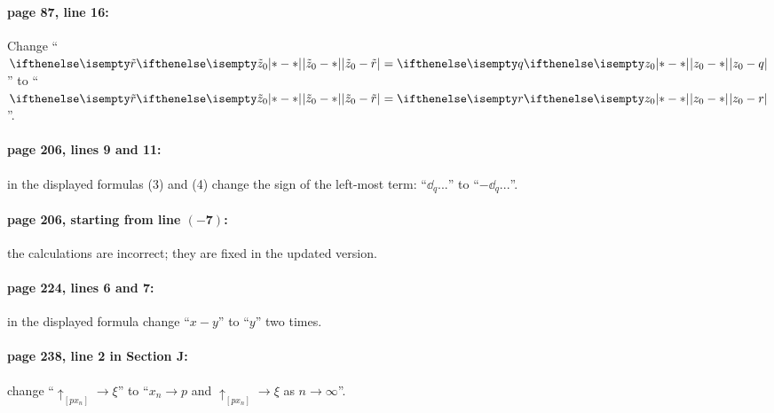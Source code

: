 \documentclass[twoside]{book}
\begin{document}
\paragraph{page 87, line 16:} Change ``$\dist{\tilde z_0}{\tilde r}{}=\dist{z_0}{q}{}$'' to ``$\dist{\tilde z_0}{\tilde r}{}=\dist{z_0}{r}{}$''.

\paragraph{page 206, lines 9 and 11:}
in the displayed formulas (3) and (4) change the sign of the left-most term: ``\(\dd_q...\)'' to ``\(-\dd_q...\)''.

\paragraph{page 206, starting from line \(\bm{(-7)}\):}
the calculations are incorrect; they are fixed in the updated version.

\paragraph{page 224, lines 6 and 7:} in the displayed formula change  ``\(x-y\)'' to ``\(y\)'' two times.

\paragraph{page 238, line 2 in Section J:}
change ``\(\uparrow_{[px_n]}\to \xi\)'' to ``\(x_n\to p\) and \(\uparrow_{[px_n]}\to \xi\) as \(n\to\infty\)''.
\end{document}
